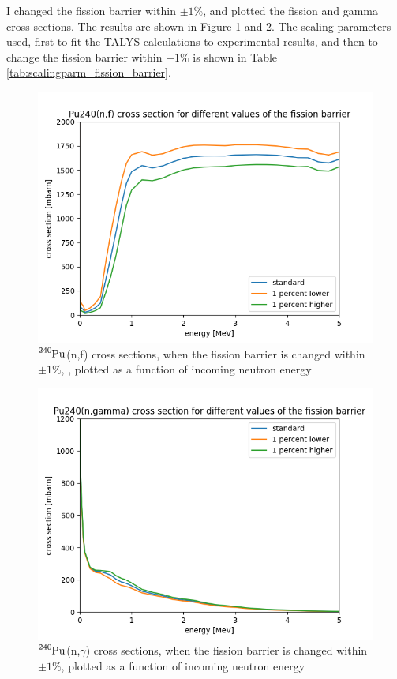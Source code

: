 \documentclass[]{article}
\begin{document}
I changed the fission barrier within $\pm 1 \%$, and plotted the fission and gamma cross sections. The results are shown in Figure \ref{fig:Fission_cross_section_varying_fission_barrier} and \ref{fig:Gamma_cross_section_varying_fission_barrier}. The scaling parameters used, first to fit the TALYS calculations to experimental results, and then to change the fission barrier within $\pm 1 \%$ is shown in Table \ref{tab:scalingparm_fission_barrier}. 

  \begin{figure} [H]
	\centering
	\includegraphics[scale=0.7]{Fission_cross_section_varying_fission_barrier.png}
	\caption{ $\ce{^{240}Pu}$(n,f) cross sections, when the fission barrier is changed within $\pm 1 \%$, , plotted as a function of incoming neutron energy }
	\label{fig:Fission_cross_section_varying_fission_barrier}
\end{figure}

  \begin{figure} [H]
	\centering
	\includegraphics[scale=0.7]{Gamma_cross_section_varying_fission_barrier.png}
	\caption{ $\ce{^{240}Pu}$(n,$\gamma$) cross sections, when the fission barrier is changed within $\pm 1 \%$, plotted as a function of incoming neutron energy}
	\label{fig:Gamma_cross_section_varying_fission_barrier}
\end{figure}
\end{document}
